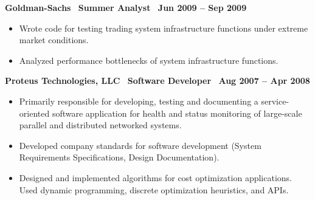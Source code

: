 \textbf{Goldman-Sachs$\>\>\>\>$Summer Analyst$\>\>\>\>$Jun 2009 – Sep 2009}
\vspace*{-0.0in}
\begin{itemize}
\item Wrote code for testing trading system infrastructure functions under extreme market conditions.
\item Analyzed performance bottlenecks of system infrastructure functions.
\end{itemize}

\textbf{Proteus Technologies, LLC$\>\>\>\>$Software Developer$\>\>\>\>$Aug 2007 – Apr 2008}
\vspace*{-0.0in}
\begin{itemize} 
\item Primarily responsible for developing, testing and documenting a service-oriented software application for health and status monitoring  of large-scale parallel and distributed networked systems.
\item Developed company standards for software development (System Requirements Specifications, Design Documentation).
\item Designed and implemented algorithms for cost optimization applications. Used dynamic programming, discrete optimization heuristics, and APIs.
\end{itemize}
